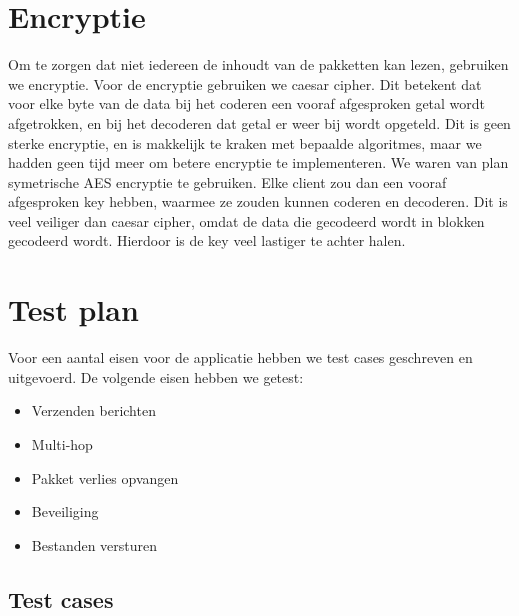 \documentclass{article}
\begin{document}
\section{Encryptie}
Om te zorgen dat niet iedereen de inhoudt van de pakketten kan lezen, gebruiken we encryptie. Voor de encryptie gebruiken we caesar cipher. Dit betekent dat voor elke byte van de data bij het coderen een vooraf afgesproken getal wordt afgetrokken, en bij het decoderen dat getal er weer bij wordt opgeteld. Dit is geen sterke encryptie, en is makkelijk te kraken met bepaalde algoritmes, maar we hadden geen tijd meer om betere encryptie te implementeren. We waren van plan symetrische AES encryptie te gebruiken. Elke client zou dan een vooraf afgesproken key hebben, waarmee ze zouden kunnen coderen en decoderen. Dit is veel veiliger dan caesar cipher, omdat de data die gecodeerd wordt in blokken gecodeerd wordt. Hierdoor is de key veel lastiger te achter halen. \\

\section{Test plan}
Voor een aantal eisen voor de applicatie hebben we test cases geschreven en uitgevoerd. De volgende eisen hebben we getest:
\begin{itemize}
\item Verzenden berichten
\item Multi-hop
\item Pakket verlies opvangen
\item Beveiliging
\item Bestanden versturen
\end{itemize}

\subsection{Test cases}
\end{document}
